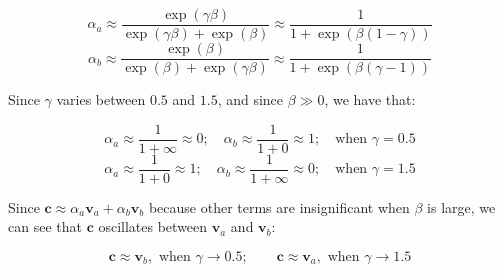 \begin{parts}
\begin{subparts}
{	$$\alpha_a\approx\frac{\exp(\gamma\beta)}{\exp(\gamma\beta)+\exp(\beta)}\approx\frac{1}{1+\exp(\beta(1-\gamma))}$$
	$$\alpha_b\approx\frac{\exp(\beta)}{\exp(\beta)+\exp(\gamma\beta)}\approx\frac{1}{1+\exp(\beta(\gamma-1))}$$
	
	Since $\gamma$ varies between $0.5$ and $1.5$, and since $\beta \gg 0$, we have that:
	
	$$\alpha_a\approx\frac{1}{1+\infty}\approx 0;\quad \alpha_b\approx\frac{1}{1+0}\approx 1;\quad\text{when }\gamma=0.5$$
	$$\alpha_a\approx\frac{1}{1+0}\approx 1;\quad \alpha_b\approx\frac{1}{1+\infty}\approx 0;\quad\text{when }\gamma=1.5$$
	
	Since $\mathbf{c}\approx\alpha_a\mathbf{v}_a+\alpha_b\mathbf{v}_b$ because other terms are insignificant when $\beta$ is large, we can see that $\mathbf{c}$ oscillates between $\mathbf{v}_a$ and $\mathbf{v}_b$:
	
	$$\mathbf{c}\approx \mathbf{v}_b, \text{ when }\gamma\to 0.5;\qquad \mathbf{c}\approx \mathbf{v}_a, \text{ when }\gamma\to 1.5$$}



\end{subparts}







\end{parts}